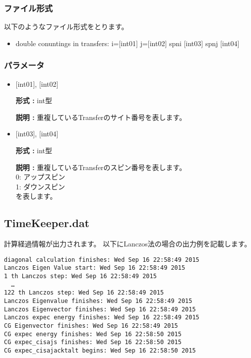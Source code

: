 \subsubsection{ファイル形式}
以下のようなファイル形式をとります。
 \begin{itemize}
   \item  double conuntings in transfers: i=$[$int01$]$ j=$[$int02$]$ spni $[$int03$]$  spnj $[$int04$]$   
 \end{itemize}
 
\subsubsection{パラメータ}
 \begin{itemize}

    \item  $[$int01$]$, $[$int02$]$
   
    {\bf 形式 :} int型

   {\bf 説明 :} 重複しているTransferのサイト番号を表します。
      
         \item  $[$int03$]$, $[$int04$]$  
   
    {\bf 形式 :} int型

   {\bf 説明 :} 重複しているTransferのスピン番号を表します。\\
0: アップスピン\\
1: ダウンスピン\\
を表します。
 
\end{itemize}

\newpage
\subsection{TimeKeeper.dat}
計算経過情報が出力されます。
以下にLanczos法の場合の出力例を記載します。

\begin{minipage}{12.5cm}
\begin{screen}
\begin{verbatim}
diagonal calculation finishes: Wed Sep 16 22:58:49 2015
Lanczos Eigen Value start: Wed Sep 16 22:58:49 2015
1 th Lanczos step: Wed Sep 16 22:58:49 2015
  …
122 th Lanczos step: Wed Sep 16 22:58:49 2015
Lanczos Eigenvalue finishes: Wed Sep 16 22:58:49 2015
Lanczos Eigenvector finishes: Wed Sep 16 22:58:49 2015
Lanczos expec energy finishes: Wed Sep 16 22:58:49 2015
CG Eigenvector finishes: Wed Sep 16 22:58:49 2015
CG expec energy finishes: Wed Sep 16 22:58:50 2015
CG expec_cisajs finishes: Wed Sep 16 22:58:50 2015
CG expec_cisajacktalt begins: Wed Sep 16 22:58:50 2015
\end{verbatim}
\end{screen}
\end{minipage}

